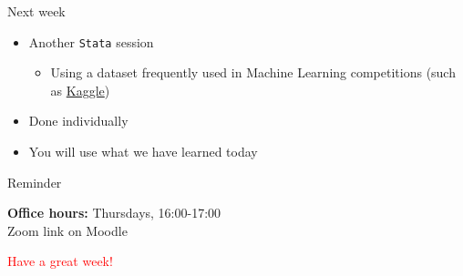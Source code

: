\documentclass[aspectratio=169, 11pt]{beamer}
\begin{document}
\begin{frame}{Next week}

\begin{itemize}
    \item Another \texttt{Stata} session
    \begin{itemize}
        \item Using a dataset frequently used in Machine Learning competitions (such as \href{https://www.kaggle.com/c/titanic}{Kaggle})
    \end{itemize}
    \item Done individually
    \item You will use what we have learned today
\end{itemize}
    
\end{frame}

\begin{frame}{Reminder}

\textbf{Office hours:} Thursdays, 16:00-17:00\\

Zoom link on Moodle

\vspace{1cm}

\begin{center}
    \textcolor{red}{Have a great week!}
\end{center}
    
\end{frame}
\end{document}
